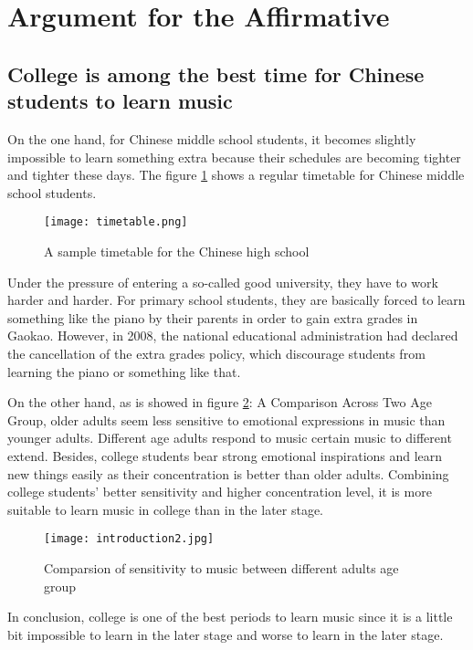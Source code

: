\section{Argument for the Affirmative}
\subsection{College is among the best time for Chinese students to learn music}
On the one hand, for Chinese middle school students, it becomes slightly impossible to learn something extra because their schedules are becoming tighter and tighter these days. The figure \ref{Timetable} shows a regular timetable for Chinese middle school students. 
\begin{figure}[h]
\centering
\texttt{[image: timetable.png]}
\label{Timetable}
\caption{A sample timetable for the Chinese high school}
\end{figure}
Under the pressure of entering a so-called good university, they have to work harder and harder. For primary school students, they are basically forced to learn something like the piano by their parents in order to gain extra grades in Gaokao. However, in 2008, the national educational administration had declared the cancellation of the extra grades policy, which discourage students from learning the piano or something like that. \par
On the other hand, as is showed in figure \ref{Comparison}: A Comparison Across Two Age Group, older adults seem less sensitive to emotional expressions in music than younger adults. Different age adults respond to music certain music to different extend. Besides, college students bear strong emotional inspirations and learn new things easily as their concentration is better than older adults. Combining college students’ better sensitivity and higher concentration level, it is more suitable to learn music in college than in the later stage.\par
\begin{figure}[h]
\centering
\texttt{[image: introduction2.jpg]}
\label{Comparison}
\caption{Comparsion of sensitivity to music between different adults age group}
\end{figure}
In conclusion, college is one of the best periods to learn music since it is a little bit impossible to learn in the later stage and worse to learn in the later stage.

